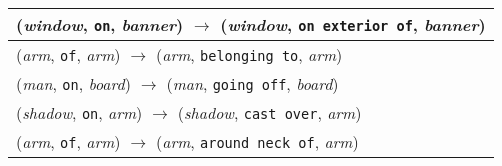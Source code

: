 \documentclass[runningheads]{llncs}
\begin{document}
{\begin{longtable}{ l }
(\textit{window}, \texttt{on}, \textit{banner}) $\rightarrow$ (\textit{window}, \texttt{on exterior of}, \textit{banner}) \\ \hline
(\textit{arm}, \texttt{of}, \textit{arm}) $\rightarrow$ (\textit{arm}, \texttt{belonging to}, \textit{arm}) \\ \hline
(\textit{man}, \texttt{on}, \textit{board}) $\rightarrow$ (\textit{man}, \texttt{going off}, \textit{board}) \\ \hline
(\textit{shadow}, \texttt{on}, \textit{arm}) $\rightarrow$ (\textit{shadow}, \texttt{cast over}, \textit{arm}) \\ \hline
(\textit{arm}, \texttt{of}, \textit{arm}) $\rightarrow$ (\textit{arm}, \texttt{around neck of}, \textit{arm}) \\ \hline
\end{longtable}
}
\end{document}
